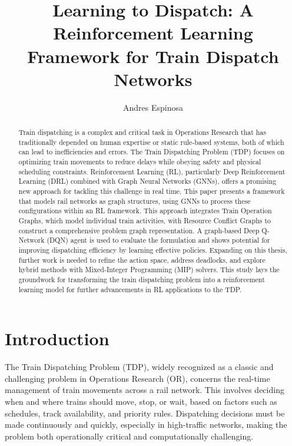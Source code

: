 \documentclass[runningheads]{llncs}
\begin{document}
\title{Learning to Dispatch: A Reinforcement Learning Framework for Train Dispatch Networks}
\titlerunning{\textcolor{uf_blue}{Learning to Dispatch}}

\author{\textcolor{uf_blue}{Andres Espinosa}}
\maketitle


\begin{abstract}
    Train dispatching is a complex and critical task in Operations Research that has traditionally depended on human expertise or static rule-based systems, both of which can lead to inefficiencies and errors. 
    The Train Dispatching Problem (TDP) focuses on optimizing train movements to reduce delays while obeying safety and physical scheduling constraints.
    Reinforcement Learning (RL), particularly Deep Reinforcement Learning (DRL) combined with Graph Neural Networks (GNNs), offers a promising new approach for tackling this challenge in real time. 
    This paper presents a framework that models rail networks as graph structures, using GNNs to process these configurations within an RL framework. 
    This approach integrates Train Operation Graphs, which model individual train activities, with Resource Conflict Graphs to construct a comprehensive problem graph representation. 
    A graph-based Deep Q-Network (DQN) agent is used to evaluate the formulation and shows potential for improving dispatching efficiency by learning effective policies. 
    Expanding on this thesis, further work is needed to refine the action space, address deadlocks, and explore hybrid methods with Mixed-Integer Programming (MIP) solvers. 
    This study lays the groundwork for transforming the train dispatching problem into a reinforcement learning model for further advancements in RL applications to the TDP.
\end{abstract}



\section{Introduction}
\label{sse:introduction}

The Train Dispatching Problem (TDP), widely recognized as a classic and challenging problem in Operations Research (OR), concerns the real-time management of train movements across a rail network.
This involves deciding when and where trains should move, stop, or wait, based on factors such as schedules, track availability, and priority rules. 
Dispatching decisions must be made continuously and quickly, especially in high-traffic networks, making the problem both operationally critical and computationally challenging.
\end{document}
